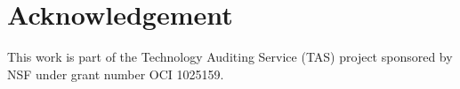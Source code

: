 \documentclass{sig-alternate}
\begin{document}
\section*{Acknowledgement} 
 
This work is part of the Technology Auditing Service (TAS) project sponsored by NSF under grant number OCI 1025159. 
 
 
 
% 
 
 
\end{document}
